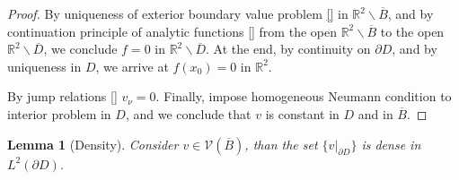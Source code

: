 \documentclass[10pt, a4paper, twoside, openright]{book}
\theoremstyle{definition}
\theoremstyle{plain}
\theoremstyle{plain}
\theoremstyle{plain}
\theoremstyle{plain}
\theoremstyle{plain}
\newtheorem{lemma}[subsection]{Lemma}
\theoremstyle{plain}
\theoremstyle{plain}
\theoremstyle{plain}
\begin{document}
\begin{proof}
 \par
 By uniqueness of exterior boundary value problem \ref{} in $\mathbb{R}^2\backslash\overline{B}$, and by continuation principle of analytic functions \ref{} from the open $\mathbb{R}^2\backslash\overline{B}$ to the open $\mathbb{R}^2\backslash\overline{D}$, we conclude $f=0$ in $\mathbb{R}^2\backslash\overline{D}$.
 At the end, by continuity on $\partial D$, and by uniqueness in $D$, we arrive at $f(x_0)=0$ in $\mathbb{R}^2$.
 \par
 By jump relations \ref{} $v_\nu = 0$. Finally, impose homogeneous Neumann condition to interior problem in $D$, and we conclude that $v$ is constant in $D$ and in $\overline{B}$.
\end{proof}

\begin{lemma}[Density]
\label{lemma:density-V-0}
 Consider $v\in \mathcal{V}(\overline{B})$, than the set $\{v|_{\partial D}\}$ is dense in $L^2(\partial D)$.
\end{lemma}
\end{document}
